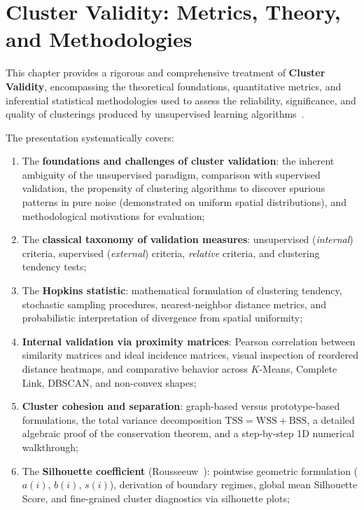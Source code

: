 \chapter{Cluster Validity: Metrics, Theory, and Methodologies}
\label{chap:dm-cluster-validity}

This chapter provides a rigorous and comprehensive treatment of \textbf{Cluster Validity}, encompassing the theoretical foundations, quantitative metrics, and inferential statistical methodologies used to assess the reliability, significance, and quality of clusterings produced by unsupervised learning algorithms~\cite{tan2018, jain1988}.

The presentation systematically covers:
\begin{enumerate}[noitemsep]
    \item The \textbf{foundations and challenges of cluster validation}: the inherent ambiguity of the unsupervised paradigm, comparison with supervised validation, the propensity of clustering algorithms to discover spurious patterns in pure noise (demonstrated on uniform spatial distributions), and methodological motivations for evaluation;
    \item The \textbf{classical taxonomy of validation measures}: unsupervised (\textit{internal}) criteria, supervised (\textit{external}) criteria, \textit{relative} criteria, and clustering tendency tests;
    \item The \textbf{Hopkins statistic}: mathematical formulation of clustering tendency, stochastic sampling procedures, nearest-neighbor distance metrics, and probabilistic interpretation of divergence from spatial uniformity;
    \item \textbf{Internal validation via proximity matrices}: Pearson correlation between similarity matrices and ideal incidence matrices, visual inspection of reordered distance heatmaps, and comparative behavior across $K$-Means, Complete Link, DBSCAN, and non-convex shapes;
    \item \textbf{Cluster cohesion and separation}: graph-based versus prototype-based formulations, the total variance decomposition $\mathrm{TSS} = \mathrm{WSS} + \mathrm{BSS}$, a detailed algebraic proof of the conservation theorem, and a step-by-step 1D numerical walkthrough;
    \item The \textbf{Silhouette coefficient} (Rousseeuw~\cite{rousseeuw1987}): pointwise geometric formulation ($a(i)$, $b(i)$, $s(i)$), derivation of boundary regimes, global mean Silhouette Score, and fine-grained cluster diagnostics via silhouette plots;

\end{enumerate}
